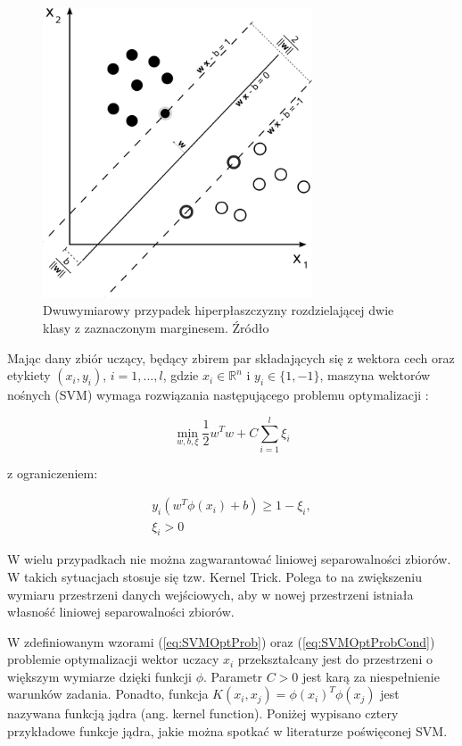 \begin{figure}[h]
	\centering
	\includegraphics[width=8cm]{Grafika/Svm_max_sep_hyperplane_with_margin}
	\caption{Dwuwymiarowy przypadek hiperpłaszczyzny rozdzielającej dwie klasy z zaznaczonym marginesem. Źródło \cite{SVMWiki}}
	\label{fig:SVM}
\end{figure}

Mając dany zbiór uczący, będący zbirem par składających się z wektora cech oraz etykiety $(x_i, y_i)$, $i = 1,...,l$, gdzie $x_i \in \mathbb{R}^n$ i $y_i \in \{1,-1\}$, maszyna wektorów nośnych (SVM) wymaga rozwiązania następującego problemu optymalizacji \cite{csie}:

\begin{equation}
\label{eq:SVMOptProb}
\min\limits_{w,b,\xi} \frac{1}{2}w^Tw+C\sum_{i=1}^{l}\xi_i
\end{equation}

z ograniczeniem:

\begin{equation}
\label{eq:SVMOptProbCond}
\begin{array}{l}
y_i\left(w^T\phi\left(x_i\right)+b\right) \geqslant 1-\xi_i,\\
\xi_i > 0
\end{array}
\end{equation}


W wielu przypadkach nie można zagwarantować liniowej separowalności zbiorów.  W takich sytuacjach stosuje się tzw. Kernel Trick. Polega to na zwiększeniu wymiaru przestrzeni danych wejściowych, aby w nowej przestrzeni istniała własność liniowej separowalności zbiorów.

W zdefiniowanym wzorami (\ref{eq:SVMOptProb}) oraz (\ref{eq:SVMOptProbCond}) problemie optymalizacji wektor uczacy $x_i$ przekształcany jest do przestrzeni o większym wymiarze dzięki funkcji $\phi$. Parametr $C>0$ jest karą za niespełnienie warunków zadania. Ponadto, funkcja $K(x_i,x_j)=\phi(x_i)^T\phi(x_j)$ jest nazywana funkcją jądra (ang. kernel function). Poniżej wypisano cztery przykładowe funkcje jądra, jakie można spotkać w literaturze poświęconej SVM.

